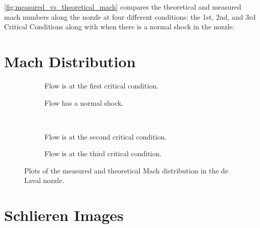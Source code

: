 \newpage
\autoref{fig:measured_vs_theoretical_mach} compares the theoretical and measured mach numbers along the nozzle at four different conditions: the 1st, 2nd, and 3rd Critical Conditions along with when there is a normal shock in the nozzle. 
\section{Mach Distribution}

\begin{figure}[htpb]
    \centering
    \begin{subfigure}{0.49\textwidth}
        \centering
        
        \caption{Flow is at the first critical condition.}
        \label{fig:measured_vs_theoretical_mach_1st_critical}
    \end{subfigure}
    \begin{subfigure}{0.49\textwidth}
        \centering
        
        \caption{Flow has a normal shock.}
        \label{fig:measured_vs_theoretical_mach_normal_shock}
    \end{subfigure} \\
    \begin{subfigure}{0.49\textwidth}
        \centering
        
        \caption{Flow is at the second critical condition.}
        \label{fig:measured_vs_theoretical_mach_2nd_critical}
    \end{subfigure}
    \begin{subfigure}{0.49\textwidth}
        \centering
        
        \caption{Flow is at the third critical condition.}
        \label{fig:measured_vs_theoretical_mach_3rd_critical}
    \end{subfigure}
    \caption{Plots of the measured and theoretical Mach distribution in the de Laval nozzle.}
    \label{fig:measured_vs_theoretical_mach}
\end{figure}

\newpage

\section{Schlieren Images}

